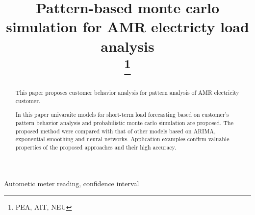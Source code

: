 \documentclass[conference]{IEEEtran}
\begin{document}
\title{Pattern-based monte carlo simulation for AMR electricty load analysis\\
\thanks{PEA, AIT, NEU}
}

\author{
\and
{}
\and
{}
\and
{}
}

\maketitle

\begin{abstract}
This paper proposes customer behavior analysis for pattern analysis of AMR electricity customer.

In this paper univaraite models for short-term load forecasting based on customer's pattern behavior analysis and probabilistic monte carlo simulation are proposed.
The proposed method were compared with that of other models based on ARIMA, exponential smoothing and neural networks.
Application examples confirm valuable properties of the proposed approaches and their high accuracy.
\end{abstract}

\begin{IEEEkeywords}
Autometic meter reading, confidence interval
\end{IEEEkeywords}
\end{document}
